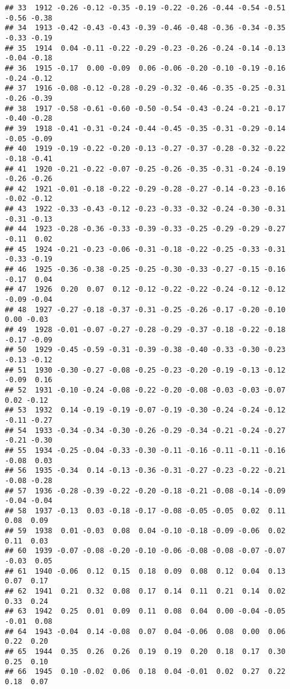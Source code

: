\documentclass[]{article}
\begin{document}
\begin{verbatim}
## 33  1912 -0.26 -0.12 -0.35 -0.19 -0.22 -0.26 -0.44 -0.54 -0.51 -0.56 -0.38
## 34  1913 -0.42 -0.43 -0.43 -0.39 -0.46 -0.48 -0.36 -0.34 -0.35 -0.33 -0.19
## 35  1914  0.04 -0.11 -0.22 -0.29 -0.23 -0.26 -0.24 -0.14 -0.13 -0.04 -0.18
## 36  1915 -0.17  0.00 -0.09  0.06 -0.06 -0.20 -0.10 -0.19 -0.16 -0.24 -0.12
## 37  1916 -0.08 -0.12 -0.28 -0.29 -0.32 -0.46 -0.35 -0.25 -0.31 -0.26 -0.39
## 38  1917 -0.58 -0.61 -0.60 -0.50 -0.54 -0.43 -0.24 -0.21 -0.17 -0.40 -0.28
## 39  1918 -0.41 -0.31 -0.24 -0.44 -0.45 -0.35 -0.31 -0.29 -0.14 -0.05 -0.09
## 40  1919 -0.19 -0.22 -0.20 -0.13 -0.27 -0.37 -0.28 -0.32 -0.22 -0.18 -0.41
## 41  1920 -0.21 -0.22 -0.07 -0.25 -0.26 -0.35 -0.31 -0.24 -0.19 -0.26 -0.26
## 42  1921 -0.01 -0.18 -0.22 -0.29 -0.28 -0.27 -0.14 -0.23 -0.16 -0.02 -0.12
## 43  1922 -0.33 -0.43 -0.12 -0.23 -0.33 -0.32 -0.24 -0.30 -0.31 -0.31 -0.13
## 44  1923 -0.28 -0.36 -0.33 -0.39 -0.33 -0.25 -0.29 -0.29 -0.27 -0.11  0.02
## 45  1924 -0.21 -0.23 -0.06 -0.31 -0.18 -0.22 -0.25 -0.33 -0.31 -0.33 -0.19
## 46  1925 -0.36 -0.38 -0.25 -0.25 -0.30 -0.33 -0.27 -0.15 -0.16 -0.17  0.04
## 47  1926  0.20  0.07  0.12 -0.12 -0.22 -0.22 -0.24 -0.12 -0.12 -0.09 -0.04
## 48  1927 -0.27 -0.18 -0.37 -0.31 -0.25 -0.26 -0.17 -0.20 -0.10  0.00 -0.03
## 49  1928 -0.01 -0.07 -0.27 -0.28 -0.29 -0.37 -0.18 -0.22 -0.18 -0.17 -0.09
## 50  1929 -0.45 -0.59 -0.31 -0.39 -0.38 -0.40 -0.33 -0.30 -0.23 -0.13 -0.12
## 51  1930 -0.30 -0.27 -0.08 -0.25 -0.23 -0.20 -0.19 -0.13 -0.12 -0.09  0.16
## 52  1931 -0.10 -0.24 -0.08 -0.22 -0.20 -0.08 -0.03 -0.03 -0.07  0.02 -0.12
## 53  1932  0.14 -0.19 -0.19 -0.07 -0.19 -0.30 -0.24 -0.24 -0.12 -0.11 -0.27
## 54  1933 -0.34 -0.34 -0.30 -0.26 -0.29 -0.34 -0.21 -0.24 -0.27 -0.21 -0.30
## 55  1934 -0.25 -0.04 -0.33 -0.30 -0.11 -0.16 -0.11 -0.11 -0.16 -0.08  0.03
## 56  1935 -0.34  0.14 -0.13 -0.36 -0.31 -0.27 -0.23 -0.22 -0.21 -0.08 -0.28
## 57  1936 -0.28 -0.39 -0.22 -0.20 -0.18 -0.21 -0.08 -0.14 -0.09 -0.04 -0.04
## 58  1937 -0.13  0.03 -0.18 -0.17 -0.08 -0.05 -0.05  0.02  0.11  0.08  0.09
## 59  1938  0.01 -0.03  0.08  0.04 -0.10 -0.18 -0.09 -0.06  0.02  0.11  0.03
## 60  1939 -0.07 -0.08 -0.20 -0.10 -0.06 -0.08 -0.08 -0.07 -0.07 -0.03  0.05
## 61  1940 -0.06  0.12  0.15  0.18  0.09  0.08  0.12  0.04  0.13  0.07  0.17
## 62  1941  0.21  0.32  0.08  0.17  0.14  0.11  0.21  0.14  0.02  0.33  0.24
## 63  1942  0.25  0.01  0.09  0.11  0.08  0.04  0.00 -0.04 -0.05 -0.01  0.08
## 64  1943 -0.04  0.14 -0.08  0.07  0.04 -0.06  0.08  0.00  0.06  0.22  0.20
## 65  1944  0.35  0.26  0.26  0.19  0.19  0.20  0.18  0.17  0.30  0.25  0.10
## 66  1945  0.10 -0.02  0.06  0.18  0.04 -0.01  0.02  0.27  0.22  0.18  0.07

\end{verbatim}
\end{document}
